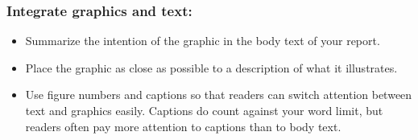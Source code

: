 \documentclass[strict]{6033dp1}
\begin{document}
\subsubsection{Integrate graphics and text:}
\begin{itemize}
\item Summarize the intention of the graphic in the body text of your
  report.
\item Place the graphic as close as possible to a description of what
  it illustrates.
\item Use figure numbers and captions so that readers can switch
  attention between text and graphics easily.  Captions do count
  against your word limit, but readers often pay more attention to
  captions than to body text.
\end{itemize}
\end{document}
